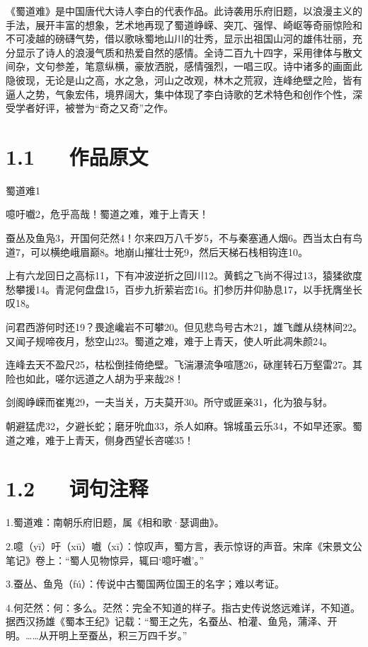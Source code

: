 \documentclass[letterpaper,10pt,english]{sphinxmanual}
\begin{document}
《蜀道难》是中国唐代大诗人李白的代表作品。此诗袭用乐府旧题，以浪漫主义的手法，展开丰富的想象，艺术地再现了蜀道峥嵘、突兀、强悍、崎岖等奇丽惊险和不可凌越的磅礴气势，借以歌咏蜀地山川的壮秀，显示出祖国山河的雄伟壮丽，充分显示了诗人的浪漫气质和热爱自然的感情。全诗二百九十四字，采用律体与散文间杂，文句参差，笔意纵横，豪放洒脱，感情强烈，一唱三叹。诗中诸多的画面此隐彼现，无论是山之高，水之急，河山之改观，林木之荒寂，连峰绝壁之险，皆有逼人之势，气象宏伟，境界阔大，集中体现了李白诗歌的艺术特色和创作个性，深受学者好评，被誉为“奇之又奇”之作。


\section{1.1   作品原文}
\label{\detokenize{p01_u6563_u6587/_u674e_u767d-_u8700_u9053_u96be:id3}}
蜀道难1

噫吁嚱2，危乎高哉！蜀道之难，难于上青天！

蚕丛及鱼凫3，开国何茫然4！尔来四万八千岁5，不与秦塞通人烟6。西当太白有鸟道7，可以横绝峨眉巅8。地崩山摧壮士死9，然后天梯石栈相钩连10。

上有六龙回日之高标11，下有冲波逆折之回川12。黄鹤之飞尚不得过13，猿猱欲度愁攀援14。青泥何盘盘15，百步九折萦岩峦16。扪参历井仰胁息17，以手抚膺坐长叹18。

问君西游何时还19？畏途巉岩不可攀20。但见悲鸟号古木21，雄飞雌从绕林间22。又闻子规啼夜月，愁空山23。蜀道之难，难于上青天，使人听此凋朱颜24。

连峰去天不盈尺25，枯松倒挂倚绝壁。飞湍瀑流争喧豗26，砯崖转石万壑雷27。其险也如此，嗟尔远道之人胡为乎来哉28！

剑阁峥嵘而崔嵬29，一夫当关，万夫莫开30。所守或匪亲31，化为狼与豺。

朝避猛虎32，夕避长蛇；磨牙吮血33，杀人如麻。锦城虽云乐34，不如早还家。蜀道之难，难于上青天，侧身西望长咨嗟35！


\section{1.2   词句注释}
\label{\detokenize{p01_u6563_u6587/_u674e_u767d-_u8700_u9053_u96be:id4}}
1.蜀道难：南朝乐府旧题，属《相和歌·瑟调曲》。

2.噫（yī）吁（xū）嚱（xī）：惊叹声，蜀方言，表示惊讶的声音。宋庠《宋景文公笔记》卷上：“蜀人见物惊异，辄曰‘噫吁嚱’。”

3.蚕丛、鱼凫（fú）：传说中古蜀国两位国王的名字；难以考证。

4.何茫然：何：多么。茫然：完全不知道的样子。指古史传说悠远难详，不知道。据西汉扬雄《蜀本王纪》记载：“蜀王之先，名蚕丛、柏灌、鱼凫，蒲泽、开明。……从开明上至蚕丛，积三万四千岁。”
\end{document}
